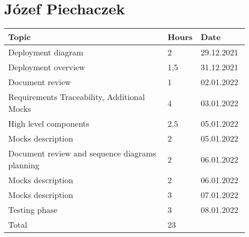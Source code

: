 \section*{Józef Piechaczek}
\begin{longtable}{@{}p{0.67\linewidth} p{0.06\linewidth} p{0.20\linewidth}@{}}
    \toprule[1.5pt]
    Topic &  Hours & Date \\ \hline
    Deployment diagram & 2 & 29.12.2021 \\
    Deployment overview & 1,5 & 31.12.2021 \\
    Document review & 1 & 02.01.2022\\
    Requirements Traceability, Additional Mocks & 4 & 03.01.2022 \\
    High level components & 2,5 & 05.01.2022 \\
    Mocks description & 2 & 05.01.2022 \\
    Document review and sequence diagrams planning & 2 & 06.01.2022\\
    Mocks description & 2 & 06.01.2022 \\
    Mocks description & 3 & 07.01.2022 \\
    Testing phase & 3 & 08.01.2022 \\
    \hline
    Total & 23 &  \\
    \bottomrule[1.5pt]
\end{longtable}

